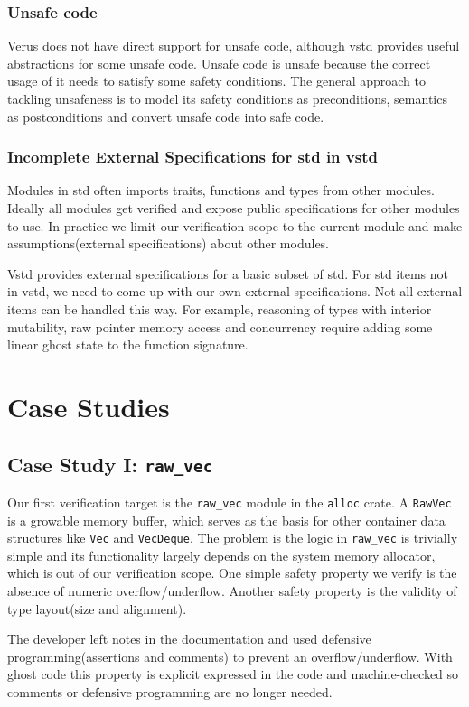 \documentclass[conference]{IEEEtran}
\begin{document}
\subsubsection{Unsafe code}
Verus does not have direct support for unsafe code, although vstd provides useful abstractions for some unsafe code. Unsafe code is unsafe because the correct usage of it needs to satisfy some safety conditions. The general approach to tackling unsafeness is to model its safety conditions as preconditions, semantics as postconditions and convert unsafe code into safe code.     

\subsubsection{Incomplete External Specifications for std in vstd}
Modules in std often imports traits, functions and types from other modules. Ideally all modules get verified and expose public specifications for other modules to use. In practice we limit our verification scope to the current module and make assumptions(external specifications) about other modules. 

Vstd provides external specifications for a basic subset of std. For std items not in vstd, we need to come up with our own external specifications. Not all external items can be handled this way. For example, reasoning of types with interior mutability, raw pointer memory access and concurrency require adding some linear ghost state to the function signature.   

\section{Case Studies}
\subsection{Case Study I: \texttt{raw\_vec}}
Our first verification target is the \texttt{raw\_vec} module in the \texttt{alloc} crate. A \texttt{RawVec} is a growable memory buffer, which serves as the basis for other container data structures like \texttt{Vec} and \texttt{VecDeque}. The problem is the logic in \texttt{raw\_vec} is trivially simple and its functionality largely depends on the system memory allocator, which is out of our verification scope. One simple safety property we verify is the absence of numeric overflow/underflow. Another safety property is the validity of type layout(size and alignment). 

The developer left notes in the documentation and used defensive programming(assertions and comments) to prevent an overflow/underflow. With ghost code this property is explicit expressed in the code and machine-checked so comments or defensive programming are no longer needed.    
\end{document}

